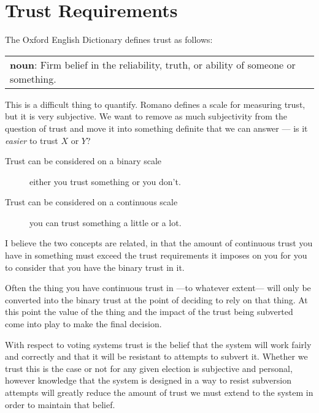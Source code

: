 \section{Trust Requirements}
\label{ch:req:trust}

The Oxford English Dictionary defines trust as follows:

\vspace{1em}
\noindent \begin{tabular}{|p{}}
    \noindent \textbf{noun}: Firm belief in the reliability, truth, or ability of someone or something.
\end{tabular}
\vspace{1em}

This is a difficult thing to quantify. Romano \cite{romanoNatureTrustConceptual2003} defines a scale for measuring trust, but it is very subjective. We want to remove as much subjectivity from the question of trust and move it into something definite that we can answer --- is it \emph{easier} to trust $X$ or $Y$?

\begin{description}
    \item[Trust can be considered on a binary scale] either you trust something or you don't.
    \item[Trust can be considered on a continuous scale] you can trust something a little or a lot.
\end{description}

I believe the two concepts are related, in that the amount of continuous trust you have in something must exceed the trust requirements it imposes on you for you to consider that you have the binary trust in it.

Often the thing you have continuous trust in ---to whatever extent--- will only be converted into the binary trust at the point of deciding to rely on that thing. At this point the value of the thing and the impact of the trust being subverted come into play to make the final decision.

With respect to voting systems trust is the belief that the system will work fairly and correctly and that it will be resistant to attempts to subvert it. Whether we trust this is the case or not for any given election is subjective and personal, however knowledge that the system is designed in a way to resist subversion attempts will greatly reduce the amount of trust we must extend to the system in order to maintain that belief.

